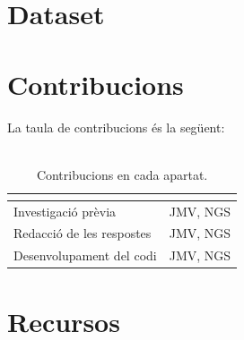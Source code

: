 \documentclass[]{scrartcl}
\begin{document}
\section{Dataset}


\section{Contribucions}
La taula de contribucions és la següent:
\\\\
\begin{table}[htbp]
	\centering
	\begin{tabular}{|l|l|}
		\hline
		\rowcolor[HTML]{000078} 
		\multicolumn{1}{|c|}{\cellcolor[HTML]{000078}{\color[HTML]{FFFFFF} \textbf{Contribucions}}} &
		\multicolumn{1}{c|}{\cellcolor[HTML]{000078}{\color[HTML]{FFFFFF} \textbf{Signatura}}} \\ \hline
		Investigació prèvia       & JMV, NGS \\ \hline
		Redacció de les respostes & JMV, NGS \\ \hline
		Desenvolupament del codi  & JMV, NGS \\ \hline
	\end{tabular}
	\caption{Contribucions en cada apartat.}
	\label{tab:Taula de contribucions}
\end{table}

\section{Recursos}
\end{document}
